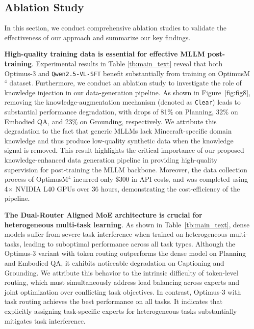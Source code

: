 
\subsection{Ablation Study}
\label{ablation_study}
In this section, we conduct comprehensive ablation studies to validate the effectiveness of our approach and summarize our key findings.

\noindent\textbf{High-quality training data is essential for effective MLLM post-training}. Experimental results in Table \ref{tb:main_text} reveal that both Optimus-3 and \texttt{Qwen2.5-VL-SFT} benefit substantially from training on OptimusM$^4$ dataset. Furthermore, we conduct an ablation study to investigate the role of knowledge injection in our data-generation pipeline. As shown in Figure~\ref{fig:fig8}, removing the knowledge-augmentation mechanism (denoted as \texttt{Clear}) leads to substantial performance degradation, with drops of 81\% on Planning, 32\% on Embodied QA, and 23\% on Grounding, respectively. We attribute this degradation to the fact that generic MLLMs lack Minecraft-specific domain knowledge and thus produce low-quality synthetic data when the knowledge signal is removed. This result highlights the critical importance of our proposed knowledge-enhanced data generation pipeline in providing high-quality supervision for post-training the MLLM backbone. Moreover, the data collection process of OptimusM$^4$ incurred only \$300 in API costs, and was completed using 4$\times$ NVIDIA L40 GPUs over 36 hours, demonstrating the cost-efficiency of the pipeline.


\noindent\textbf{The Dual-Router Aligned MoE architecture is crucial for heterogeneous multi-task learning}. As shown in Table~\ref{tb:main_text}, dense models suffer from severe task interference when trained on heterogeneous multi-tasks, leading to suboptimal performance across all task types. Although the Optimus-3 variant with token routing outperforms the dense model on Planning and Embodied QA, it exhibits noticeable degradation on Captioning and Grounding. We attribute this behavior to the intrinsic difficulty of token-level routing, which must simultaneously address load balancing across experts and joint optimization over conflicting task objectives. In contrast, Optimus-3 with task routing achieves the best performance on all tasks. It indicates that explicitly assigning task-specific experts for heterogeneous tasks substantially mitigates task interference.



